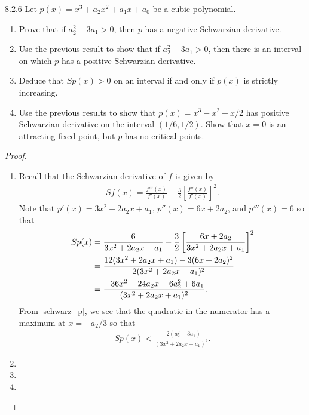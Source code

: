 \begin{problem}{8.2.6}
  Let $p(x) = x^3 + a_2 x^2 + a_1 x + a_0$ be a cubic polynomial.
  \begin{enumerate}
    \item Prove that if $a_2^2 - 3a_1 > 0$, then $p$ has a negative Schwarzian derivative.
    \item Use the previous result to show that if $a_2^2 - 3a_1 > 0$, then there is an interval
      on which $p$ has a positive Schwarzian derivative.
    \item Deduce that $Sp(x) >0$ on an interval if and only if
      $p(x)$ is strictly increasing.
    \item Use the previous results to show that $p(x) = x^3-x^2+x/2$ has positive
      Schwarzian derivative on the interval $(1/6, 1/2)$. Show that $x=0$ is an attracting fixed point,
      but $p$ has no critical points.
  \end{enumerate}
\end{problem}

\begin{proof}
  \begin{enumerate}
    \item Recall that the Schwarzian derivative of $f$ is given by
      \begin{align*}
        Sf(x) = \frac{f'''(x)}{f'(x)} - \frac{3}{2}\left[\frac{f''(x)}{f'(x)}\right]^2.
      \end{align*}
      Note that $p'(x) = 3x^2 + 2 a_2 x + a_1$, $p''(x)= 6x + 2a_2$, and $p'''(x) =  6$ so that
      \begin{align}\label{schwarz_p}
        Sp(x)
        &= \frac{6}{3x^2 + 2 a_2 x + a_1} - \frac{3}{2}\left[\frac{6x + 2a_2}{3x^2 + 2 a_2 x + a_1}\right]^2 \notag\\
        &= \frac{12(3x^2 + 2 a_2 x + a_1)-3(6x + 2a_2)^2}{2(3x^2 + 2 a_2 x + a_1)^2} \notag \\
        &= \frac{-36x^2-24a_2 x-6a_2^2+6a_1}{(3x^2 + 2 a_2 x + a_1)^2}.
      \end{align}
      From \eqref{schwarz_p}, we see that the quadratic in the numerator has a maximum at $x=-a_2/3$ so that
      \begin{align*}
        Sp(x) < \frac{-2(a_2^2 - 3 a_1)}{(3x^2 + 2 a_2 x + a_1)^2}.
      \end{align*}
    \item
    \item
    \item
  \end{enumerate}
\end{proof}
\newpage
